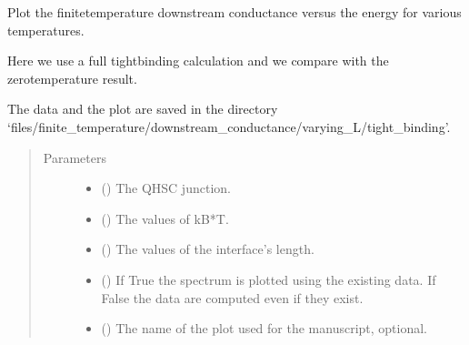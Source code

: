 \documentclass[letterpaper,10pt,english]{sphinxmanual}
\begin{document}

\begin{fulllineitems}
\label{\detokenize{modules:modules.utils.plot_finite_T_conductance_TB_vs_L_various_temps}}
\pysigstartsignatures
{}
\pysigstopsignatures
\sphinxAtStartPar
Plot the finite\sphinxhyphen{}temperature downstream conductance versus the energy for various temperatures.

\sphinxAtStartPar
Here we use a full tight\sphinxhyphen{}binding calculation and we compare with the zero\sphinxhyphen{}temperature result.

\sphinxAtStartPar
The data and the plot are saved in the directory
‘files/finite\_temperature/downstream\_conductance/varying\_L/tight\_binding’.
\begin{quote}\begin{description}
\item[{Parameters}] \leavevmode\begin{itemize}
\item {} 
\sphinxAtStartPar
{} () \textendash{} The QH\sphinxhyphen{}SC junction.

\item {} 
\sphinxAtStartPar
{} () \textendash{} The values of kB*T.

\item {} 
\sphinxAtStartPar
{} () \textendash{} The values of the interface’s length.

\item {} 
\sphinxAtStartPar
{} () \textendash{} If True the spectrum is plotted using the existing data.
If False the data are computed even if they exist.

\item {} 
\sphinxAtStartPar
{} () \textendash{} The name of the plot used for the manuscript, optional.

\end{itemize}

\end{description}\end{quote}

\end{fulllineitems}
\end{document}
